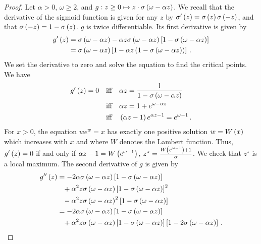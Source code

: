 \begin{proof}
  Let $\alpha > 0$, $\omega \geq 2$, and $g: z \geq 0 \mapsto z \cdot \sigma \left( \omega - \alpha z \right)$. We recall that the derivative of the sigmoid function is given for any $z$ by $\sigma' \left( z \right) = \sigma \left( z \right) \sigma \left( - z \right)$, and that $\sigma \left( - z \right) = 1 - \sigma \left( z \right)$. $g$ is twice differentiable. Its first derivative is given by
  \begin{align*}
    g' \left( z \right) &= \sigma \left( \omega - \alpha z \right) - \alpha z \sigma \left( \omega - \alpha z \right) \left[ 1 - \sigma \left( \omega - \alpha z \right) \right] \\
    &= \sigma \left( \omega - \alpha z \right) \left[ 1 - \alpha z \left( 1 - \sigma \left( \omega - \alpha z \right) \right) \right]\,.
  \end{align*}
  We set the derivative to zero and solve the equation to find the critical points. We have
  \begin{align}
    g' \left( z \right) = 0 &\quad\text{iff}\quad \alpha z = \frac{1}{1 - \sigma \left( \omega - \alpha z \right)} \label{eq:critical-point-prop} \\
    &\quad\text{iff}\quad \alpha z = 1 + e^{\omega - \alpha z} \nonumber \\
    &\quad\text{iff}\quad \left( \alpha z - 1 \right) e^{\alpha z - 1} = e^{\omega - 1}\,. \nonumber
  \end{align}
  For $x > 0$, the equation $w e^w = x$ has exactly one positive solution $w = W \left( x \right)$ which increases with $x$ and where $W$ denotes the Lambert function. Thus, $g' \left( z \right) = 0$ if and only if $\alpha z - 1 = W \left( e^{\omega - 1} \right)$, \ie $z^\star = \frac{W \left( e^{\omega - 1} \right) + 1}{\alpha}$. We check that $z^\star$ is a local maximum. The second derivative of $g$ is given by
  \begin{align*}
    g'' \left( z \right) &= - 2 \alpha \sigma \left( \omega - \alpha z \right) \left[ 1 - \sigma \left( \omega - \alpha z \right) \right] \\
    &\phantom{=}+ \alpha^2 z \sigma \left( \omega - \alpha z \right) \left[ 1 - \sigma \left( \omega - \alpha z \right) \right]^2 \\
    &\phantom{=}- \alpha^2 z \sigma \left( \omega - \alpha z \right)^2 \left[ 1 - \sigma \left( \omega - \alpha z \right) \right] \\
    &= - 2 \alpha \sigma \left( \omega - \alpha z \right) \left[ 1 - \sigma \left( \omega - \alpha z \right) \right] \\
    &\phantom{=}+ \alpha^2 z \sigma \left( \omega - \alpha z \right) \left[ 1 - \sigma \left( \omega - \alpha z \right) \right] \left[ 1 - 2 \sigma \left( \omega - \alpha z \right) \right]\,.
  \end{align*}

\end{proof}

